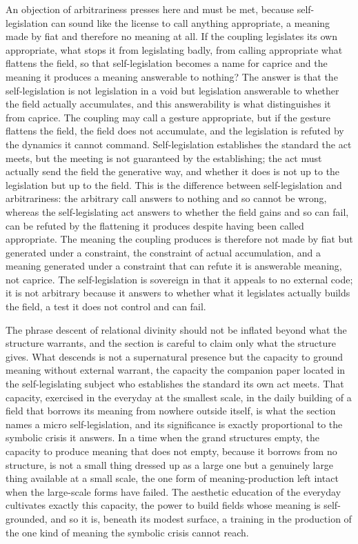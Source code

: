An objection of arbitrariness presses here and must be met, because self-legislation can sound like the license to call anything appropriate, a meaning made by fiat and therefore no meaning at all. If the coupling legislates its own appropriate, what stops it from legislating badly, from calling appropriate what flattens the field, so that self-legislation becomes a name for caprice and the meaning it produces a meaning answerable to nothing? The answer is that the self-legislation is not legislation in a void but legislation answerable to whether the field actually accumulates, and this answerability is what distinguishes it from caprice. The coupling may call a gesture appropriate, but if the gesture flattens the field, the field does not accumulate, and the legislation is refuted by the dynamics it cannot command. Self-legislation establishes the standard the act meets, but the meeting is not guaranteed by the establishing; the act must actually send the field the generative way, and whether it does is not up to the legislation but up to the field. This is the difference between self-legislation and arbitrariness: the arbitrary call answers to nothing and so cannot be wrong, whereas the self-legislating act answers to whether the field gains and so can fail, can be refuted by the flattening it produces despite having been called appropriate. The meaning the coupling produces is therefore not made by fiat but generated under a constraint, the constraint of actual accumulation, and a meaning generated under a constraint that can refute it is answerable meaning, not caprice. The self-legislation is sovereign in that it appeals to no external code; it is not arbitrary because it answers to whether what it legislates actually builds the field, a test it does not control and can fail.

The phrase descent of relational divinity should not be inflated beyond what the structure warrants, and the section is careful to claim only what the structure gives. What descends is not a supernatural presence but the capacity to ground meaning without external warrant, the capacity the companion paper located in the self-legislating subject who establishes the standard its own act meets. That capacity, exercised in the everyday at the smallest scale, in the daily building of a field that borrows its meaning from nowhere outside itself, is what the section names a micro self-legislation, and its significance is exactly proportional to the symbolic crisis it answers. In a time when the grand structures empty, the capacity to produce meaning that does not empty, because it borrows from no structure, is not a small thing dressed up as a large one but a genuinely large thing available at a small scale, the one form of meaning-production left intact when the large-scale forms have failed. The aesthetic education of the everyday cultivates exactly this capacity, the power to build fields whose meaning is self-grounded, and so it is, beneath its modest surface, a training in the production of the one kind of meaning the symbolic crisis cannot reach.

